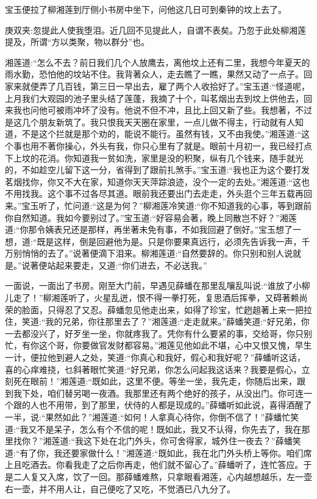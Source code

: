 \begin{parag}
    宝玉便拉了柳湘莲到厅侧小书房中坐下，问他这几日可到秦钟的坟上去了。\begin{note}庚双夹:忽提此人使我堕泪。近几回不见提此人，自谓不表矣。乃忽于此处柳湘莲提及，所谓“方以类聚，物以群分”也。\end{note}湘莲道:“怎么不去？前日我们几个人放鹰去，离他坟上还有二里，我想今年夏天的雨水勤，恐怕他的坟站不住。我背著众人，走去瞧了一瞧，果然又动了一点子。回家来就便弄了几百钱，第三日一早出去，雇了两个人收拾好了。”宝玉道:“怪道呢，上月我们大观园的池子里头结了莲蓬，我摘了十个，叫茗烟出去到坟上供他去，回来我也问他可被雨冲坏了没有。他说不但不冲，且比上回又新了些。我想著，不过是这几个朋友新筑了。我只恨我天天圈在家里，一点儿做不得主，行动就有人知道，不是这个拦就是那个劝的，能说不能行。虽然有钱，又不由我使。”湘莲道:“这个事也用不著你操心，外头有我，你只心里有了就是。眼前十月初一，我已经打点下上坟的花消。你知道我一贫如洗，家里是没的积聚，纵有几个钱来，随手就光的，不如趁空儿留下这一分，省得到了跟前扎煞手。”宝玉道:“我也正为这个要打发茗烟找你，你又不大在家，知道你天天萍踪浪迹，没个一定的去处。”湘莲道:“这也不用找我。这个事不过各尽其道。眼前我还要出门去走走，外头逛个三年五载再回来。”宝玉听了，忙问道:“这是为何？”柳湘莲冷笑道:“你不知道我的心事，等到跟前你自然知道。我如今要别过了。”宝玉道:“好容易会著，晚上同散岂不好？”湘莲道:“你那令姨表兄还是那样，再坐著未免有事，不如我回避了倒好。”宝玉想了一想，道:“既是这样，倒是回避他为是。只是你要果真远行，必须先告诉我一声，千万别悄悄的去了。”说著便滴下泪来。柳湘莲道:“自然要辞的。你只别和别人说就是。”说著便站起来要走，又道:“你们进去，不必送我。”
\end{parag}


\begin{parag}
    一面说，一面出了书房。刚至大门前，早遇见薛蟠在那里乱嚷乱叫说:“谁放了小柳儿走了！”柳湘莲听了，火星乱迸，恨不得一拳打死，复思酒后挥拳，又碍著赖尚荣的脸面，只得忍了又忍。薛蟠忽见他走出来，如得了珍宝，忙趔趄著上来一把拉住，笑道:“我的兄弟，你往那里去了？”湘莲道:“走走就来。”薛蟠笑道:“好兄弟，你一去都没兴了，好歹坐一坐，你就疼我了。凭你有什么要紧的事，交给哥，你只别忙，有你这个哥，你要做官发财都容易。”湘莲见他如此不堪，心中又恨又愧，早生一计，便拉他到避人之处，笑道:“你真心和我好，假心和我好呢？”薛蟠听这话，喜的心痒难挠，乜斜著眼忙笑道:“好兄弟，你怎么问起我这话来？我要是假心，立刻死在眼前！”湘莲道:“既如此，这里不便。等坐一坐，我先走，你随后出来，跟到我下处，咱们替另喝一夜酒。我那里还有两个绝好的孩子，从没出门。你可连一个跟的人也不用带，到了那里，伏侍的人都是现成的。”薛蟠听如此说，喜得酒醒了一半，说:“果然如此？”湘莲道:“如何！人拿真心待你，你倒不信了！”薛蟠忙笑道:“我又不是呆子，怎么有个不信的呢！既如此，我又不认得，你先去了，我在那里找你？”湘莲道:“我这下处在北门外头，你可舍得家，城外住一夜去？”薛蟠笑道:“有了你，我还要家做什么！”湘莲道:“既如此，我在北门外头桥上等你。咱们席上且吃酒去。你看我走了之后你再走，他们就不留心了。”薛蟠听了，连忙答应。于是二人复又入席，饮了一回。那薛蟠难熬，只拿眼看湘莲，心内越想越乐，左一壶右一壶，并不用人让，自己便吃了又吃，不觉酒已八九分了。
\end{parag}


